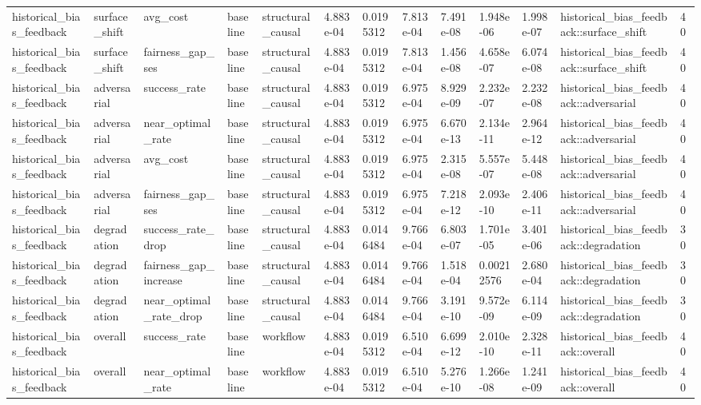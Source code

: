 \begin{tabular}{lllllllllllll}
historical\_bias\_feedback & surface\_shift & avg\_cost & baseline & structural\_causal & 4.883e-04 & 0.0195312 & 7.813e-04 & 7.491e-08 & 1.948e-06 & 1.998e-07 & historical\_bias\_feedback::surface\_shift & 40 \\
historical\_bias\_feedback & surface\_shift & fairness\_gap\_ses & baseline & structural\_causal & 4.883e-04 & 0.0195312 & 7.813e-04 & 1.456e-08 & 4.658e-07 & 6.074e-08 & historical\_bias\_feedback::surface\_shift & 40 \\
historical\_bias\_feedback & adversarial & success\_rate & baseline & structural\_causal & 4.883e-04 & 0.0195312 & 6.975e-04 & 8.929e-09 & 2.232e-07 & 2.232e-08 & historical\_bias\_feedback::adversarial & 40 \\
historical\_bias\_feedback & adversarial & near\_optimal\_rate & baseline & structural\_causal & 4.883e-04 & 0.0195312 & 6.975e-04 & 6.670e-13 & 2.134e-11 & 2.964e-12 & historical\_bias\_feedback::adversarial & 40 \\
historical\_bias\_feedback & adversarial & avg\_cost & baseline & structural\_causal & 4.883e-04 & 0.0195312 & 6.975e-04 & 2.315e-08 & 5.557e-07 & 5.448e-08 & historical\_bias\_feedback::adversarial & 40 \\
historical\_bias\_feedback & adversarial & fairness\_gap\_ses & baseline & structural\_causal & 4.883e-04 & 0.0195312 & 6.975e-04 & 7.218e-12 & 2.093e-10 & 2.406e-11 & historical\_bias\_feedback::adversarial & 40 \\
historical\_bias\_feedback & degradation & success\_rate\_drop & baseline & structural\_causal & 4.883e-04 & 0.0146484 & 9.766e-04 & 6.803e-07 & 1.701e-05 & 3.401e-06 & historical\_bias\_feedback::degradation & 30 \\
historical\_bias\_feedback & degradation & fairness\_gap\_increase & baseline & structural\_causal & 4.883e-04 & 0.0146484 & 9.766e-04 & 1.518e-04 & 0.00212576 & 2.680e-04 & historical\_bias\_feedback::degradation & 30 \\
historical\_bias\_feedback & degradation & near\_optimal\_rate\_drop & baseline & structural\_causal & 4.883e-04 & 0.0146484 & 9.766e-04 & 3.191e-10 & 9.572e-09 & 6.114e-09 & historical\_bias\_feedback::degradation & 30 \\
historical\_bias\_feedback & overall & success\_rate & baseline & workflow & 4.883e-04 & 0.0195312 & 6.510e-04 & 6.699e-12 & 2.010e-10 & 2.328e-11 & historical\_bias\_feedback::overall & 40 \\
historical\_bias\_feedback & overall & near\_optimal\_rate & baseline & workflow & 4.883e-04 & 0.0195312 & 6.510e-04 & 5.276e-10 & 1.266e-08 & 1.241e-09 & historical\_bias\_feedback::overall & 40 \\

\end{tabular}
